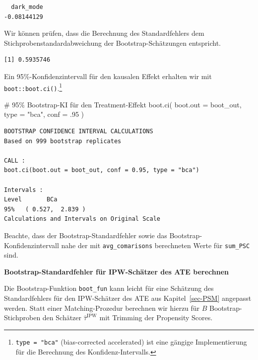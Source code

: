 \documentclass[
  a4paper,
  DIV=11,
  oneside]{scrreprt}
\newenvironment{Shaded}{\begin{snugshade}}{\end{snugshade}}
\newcommand{\AttributeTok}[1]{\textcolor[rgb]{0.40,0.45,0.13}{#1}}
\newcommand{\CommentTok}[1]{\textcolor[rgb]{0.37,0.37,0.37}{#1}}
\newcommand{\DecValTok}[1]{\textcolor[rgb]{0.68,0.00,0.00}{#1}}
\newcommand{\FunctionTok}[1]{\textcolor[rgb]{0.28,0.35,0.67}{#1}}
\newcommand{\NormalTok}[1]{\textcolor[rgb]{0.00,0.23,0.31}{#1}}
\newcommand{\SpecialCharTok}[1]{\textcolor[rgb]{0.37,0.37,0.37}{#1}}
\newcommand{\StringTok}[1]{\textcolor[rgb]{0.13,0.47,0.30}{#1}}
\begin{document}
\begin{verbatim}
  dark_mode 
-0.08144129 
\end{verbatim}

Wir können prüfen, dass die Berechnung des Standardfehlers dem
Stichprobenstandardabweichung der Bootstrap-Schätzungen entspricht.

\begin{Shaded}
\end{Shaded}

\begin{verbatim}
[1] 0.5935746
\end{verbatim}

Ein 95\%-Konfidenzintervall für den kausalen Effekt erhalten wir mit
\texttt{boot::boot.ci()}.\footnote{\texttt{type\ =\ "bca"}
  (bias-corrected accelerated) ist eine gängige Implementierung für die
  Berechnung des Konfidenz-Intervalls.}

\begin{Shaded}
\begin{Highlighting}[]
\CommentTok{\# 95\% Bootstrap{-}KI für den Treatment{-}Effekt}
\FunctionTok{boot.ci}\NormalTok{(}
  \AttributeTok{boot.out =}\NormalTok{ boot\_out, }
  \AttributeTok{type =} \StringTok{"bca"}\NormalTok{, }
  \AttributeTok{conf =}\NormalTok{ .}\DecValTok{95}
\NormalTok{)}
\end{Highlighting}
\end{Shaded}

\begin{verbatim}
BOOTSTRAP CONFIDENCE INTERVAL CALCULATIONS
Based on 999 bootstrap replicates

CALL : 
boot.ci(boot.out = boot_out, conf = 0.95, type = "bca")

Intervals : 
Level       BCa          
95%   ( 0.527,  2.839 )  
Calculations and Intervals on Original Scale
\end{verbatim}

Beachte, dass der Bootstrap-Standardfehler sowie das
Bootstrap-Konfidenzintervall nahe der mit \texttt{avg\_comarisons}
berechneten Werte für \texttt{sum\_PSC} sind.

\textbf{Bootstrap-Standardfehler für IPW-Schätzer des ATE berechnen}

Die Bootstrap-Funktion \texttt{boot\_fun} kann leicht für eine Schätzung
des Standardfehlers für den IPW-Schätzer des ATE aus
Kapitel~\ref{sec-PSM} angepasst werden. Statt einer Matching-Prozedur
berechnen wir hierzu für \(B\) Bootstrap-Stichproben den Schätzer
\(\widehat{\tau}^\text{IPW}\) mit Trimming der Propensity Scores.
\end{document}
